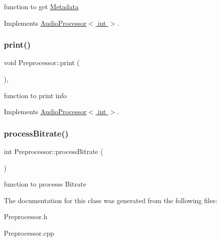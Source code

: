 function to get \hyperlink{structMetadata}{Metadata} 

Implements \hyperlink{classAudioProcessor}{Audio\+Processor$<$ int $>$}.

\mbox{\label{classPreprocessor_a7b4264680c47a71a0ae4f735501f3acf}} 
\subsubsection{\texorpdfstring{print()}{print()}}
{\footnotesize\ttfamily void Preprocessor\+::print (\begin{DoxyParamCaption}{ }\end{DoxyParamCaption})\hspace{0.3cm}{\ttfamily [override]}, {\ttfamily [virtual]}}

function to print info 

Implements \hyperlink{classAudioProcessor}{Audio\+Processor$<$ int $>$}.

\mbox{\label{classPreprocessor_ad996082402e7c64d6e81ba06719a7b77}} 
\subsubsection{\texorpdfstring{process\+Bitrate()}{processBitrate()}}
{\footnotesize\ttfamily int Preprocessor\+::process\+Bitrate (\begin{DoxyParamCaption}{ }\end{DoxyParamCaption})}

function to processs Bitrate 

The documentation for this class was generated from the following files\+:\begin{DoxyCompactItemize}
\item 
Preprocessor.\+h\item 
Preprocessor.\+cpp\end{DoxyCompactItemize}
